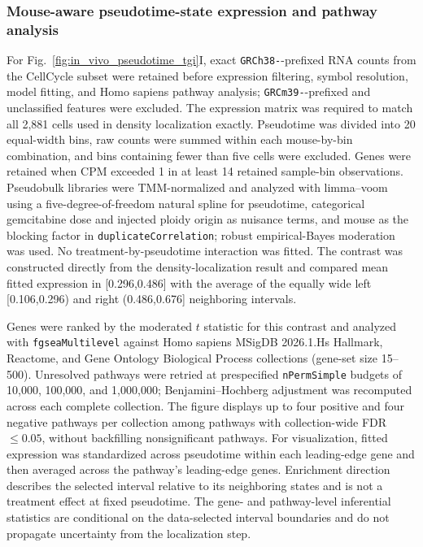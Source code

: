 \documentclass[11pt,notitlepage]{article}
\begin{document}
\subsubsection{Mouse-aware pseudotime-state expression and pathway analysis}
For Fig.~\ref{fig:in_vivo_pseudotime_tgi}I, exact \texttt{GRCh38-}-prefixed RNA counts from the CellCycle subset were retained before expression filtering, symbol resolution, model fitting, and Homo sapiens pathway analysis; \texttt{GRCm39-}-prefixed and unclassified features were excluded. The expression matrix was required to match all 2,881 cells used in density localization exactly. Pseudotime was divided into 20 equal-width bins, raw counts were summed within each mouse-by-bin combination, and bins containing fewer than five cells were excluded. Genes were retained when CPM exceeded 1 in at least 14 retained sample-bin observations. Pseudobulk libraries were TMM-normalized and analyzed with limma--voom using a five-degree-of-freedom natural spline for pseudotime, categorical gemcitabine dose and injected ploidy origin as nuisance terms, and mouse as the blocking factor in \texttt{duplicateCorrelation}; robust empirical-Bayes moderation was used. No treatment-by-pseudotime interaction was fitted. The contrast was constructed directly from the density-localization result and compared mean fitted expression in [0.296,0.486] with the average of the equally wide left [0.106,0.296) and right (0.486,0.676] neighboring intervals.

Genes were ranked by the moderated $t$ statistic for this contrast and analyzed with \texttt{fgseaMultilevel} against Homo sapiens MSigDB 2026.1.Hs Hallmark, Reactome, and Gene Ontology Biological Process collections (gene-set size 15--500). Unresolved pathways were retried at prespecified \texttt{nPermSimple} budgets of 10,000, 100,000, and 1,000,000; Benjamini--Hochberg adjustment was recomputed across each complete collection. The figure displays up to four positive and four negative pathways per collection among pathways with collection-wide FDR $\leq 0.05$, without backfilling nonsignificant pathways. For visualization, fitted expression was standardized across pseudotime within each leading-edge gene and then averaged across the pathway's leading-edge genes. Enrichment direction describes the selected interval relative to its neighboring states and is not a treatment effect at fixed pseudotime. The gene- and pathway-level inferential statistics are conditional on the data-selected interval boundaries and do not propagate uncertainty from the localization step.



\clearpage
 

\end{document}

